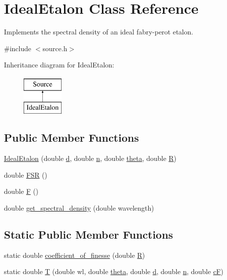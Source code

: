 \hypertarget{class_ideal_etalon}{}\section{Ideal\+Etalon Class Reference}
\label{class_ideal_etalon}


Implements the spectral density of an ideal fabry-\/perot etalon.  




{\ttfamily \#include $<$source.\+h$>$}

Inheritance diagram for Ideal\+Etalon\+:\begin{figure}[H]
\begin{center}
\leavevmode
\includegraphics[height=2.000000cm]{class_ideal_etalon}
\end{center}
\end{figure}
\subsection*{Public Member Functions}
\begin{DoxyCompactItemize}
\item 
\hyperlink{class_ideal_etalon_acde8c0bcfe454c60177b00116ed5ae7e}{Ideal\+Etalon} (double \hyperlink{class_ideal_etalon_a8f63e477f8637502ef97b2f45875f57a}{d}, double \hyperlink{class_ideal_etalon_a1b1004d0898c3a054ca9cf412813c9d5}{n}, double \hyperlink{class_ideal_etalon_adb01dc93fb40a0735b5ed00907ffe0fd}{theta}, double \hyperlink{class_ideal_etalon_ae545946e739c8079c0ced7f836180cd1}{R})
\item 
double \hyperlink{class_ideal_etalon_a07e0545a681973d6be2e51e14a8945ef}{F\+SR} ()
\item 
double \hyperlink{class_ideal_etalon_a4b5547956e9795be364365e4997050c7}{F} ()
\item 
double \hyperlink{class_ideal_etalon_a6ba6c6d89e88e646da38ec45d12dab09}{get\+\_\+spectral\+\_\+density} (double wavelength)
\end{DoxyCompactItemize}
\subsection*{Static Public Member Functions}
\begin{DoxyCompactItemize}
\item 
static double \hyperlink{class_ideal_etalon_afc504294c3102f5a11de8cab99dc7943}{coefficient\+\_\+of\+\_\+finesse} (double \hyperlink{class_ideal_etalon_ae545946e739c8079c0ced7f836180cd1}{R})
\item 
static double \hyperlink{class_ideal_etalon_a18df1a0ca15f7d71763713f867cf3532}{T} (double wl, double \hyperlink{class_ideal_etalon_adb01dc93fb40a0735b5ed00907ffe0fd}{theta}, double \hyperlink{class_ideal_etalon_a8f63e477f8637502ef97b2f45875f57a}{d}, double \hyperlink{class_ideal_etalon_a1b1004d0898c3a054ca9cf412813c9d5}{n}, double \hyperlink{class_ideal_etalon_a93f909e0b51e64a057ac90985c5257fc}{cF})
\end{DoxyCompactItemize}
